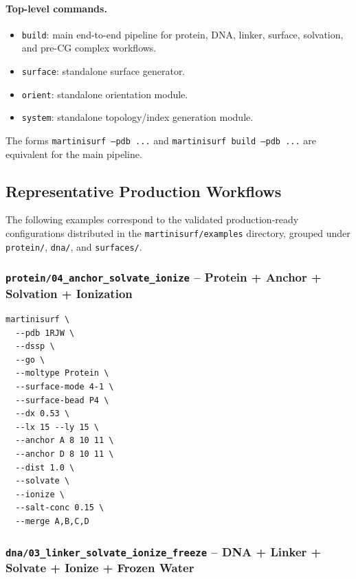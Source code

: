 \documentclass[11pt]{article}
\begin{document}
\paragraph{Top-level commands.}
\begin{itemize}
  \item \texttt{build}: main end-to-end pipeline for protein, DNA,
  linker, surface, solvation, and pre-CG complex workflows.
  \item \texttt{surface}: standalone surface generator.
  \item \texttt{orient}: standalone orientation module.
  \item \texttt{system}: standalone topology/index generation module.
\end{itemize}

The forms \texttt{martinisurf --pdb ...} and
\texttt{martinisurf build --pdb ...} are equivalent for the main pipeline.


\subsection{Representative Production Workflows}

The following examples correspond to the validated
production-ready configurations distributed in the
\texttt{martinisurf/examples} directory, grouped under
\texttt{protein/}, \texttt{dna/}, and \texttt{surfaces/}.

\subsubsection*{\texttt{protein/04\_anchor\_solvate\_ionize} -- Protein + Anchor + Solvation + Ionization}

\begin{lstlisting}
martinisurf \
  --pdb 1RJW \
  --dssp \
  --go \
  --moltype Protein \
  --surface-mode 4-1 \
  --surface-bead P4 \
  --dx 0.53 \
  --lx 15 --ly 15 \
  --anchor A 8 10 11 \
  --anchor D 8 10 11 \
  --dist 1.0 \
  --solvate \
  --ionize \
  --salt-conc 0.15 \
  --merge A,B,C,D
\end{lstlisting}

\subsubsection*{\texttt{dna/03\_linker\_solvate\_ionize\_freeze} -- DNA + Linker + Solvate + Ionize + Frozen Water}
\end{document}
